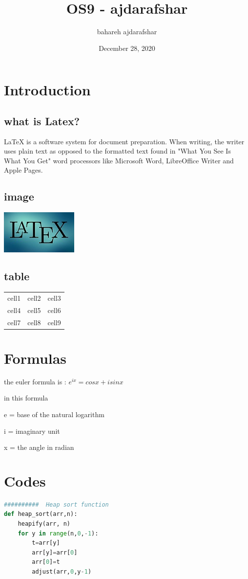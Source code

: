 \documentclass{article}
\title{OS9 - ajdarafshar}
\author{bahareh ajdarafshar}
\date{December 28, 2020}
\begin{document}
\maketitle
\section{Introduction}
\subsection{what is Latex?}
LaTeX is a software system for document preparation. When writing, the writer uses plain text as opposed to the formatted text found in "What You See Is What You Get" word processors like Microsoft Word, LibreOffice Writer and Apple Pages.
\subsection{image}
\includegraphics{latex.jpg}      
\subsection{table}
\begin{center}
\begin{tabular}{ |c|c|c| } 
 \hline
 cell1 & cell2 & cell3 \\ 
 cell4 & cell5 & cell6 \\ 
 cell7 & cell8 & cell9 \\
 \hline
\end{tabular}
\end{center}
\section{Formulas}
the euler formula is : $ e^{ix} = cosx + isinx $

in this formula 

e = base of the natural logarithm

i = imaginary unit

x = the angle in radian
\\
\section{Codes}
\begin{lstlisting}[language=Python]
##########  Heap sort function
def heap_sort(arr,n):
    heapify(arr, n)
    for y in range(n,0,-1):
        t=arr[y]
        arr[y]=arr[0]
        arr[0]=t
        adjust(arr,0,y-1)
\end{lstlisting}
\end{document}
